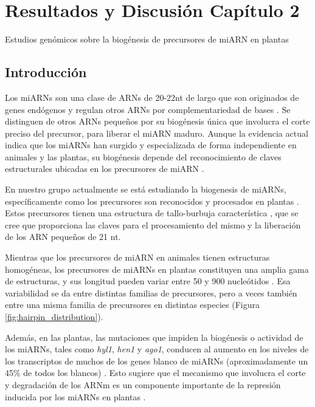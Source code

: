 \graphicspath{{Chapter2/Figs/}}

\setcounter{chapter}{5}
\chapter*{Resultados y Discusión Capítulo 2} 

{\LARGE Estudios genómicos sobre la biogénesis de precursores de miARN en plantas}


\section{Introducción}
Los miARNs son una clase de ARNs de 20-22nt de largo que son originados de genes endógenos y regulan otros ARNs por complementariedad de bases \citep{Voinnet2009669}.
Se distinguen de otros ARNs pequeños por su biogénesis única que involucra el corte preciso del precursor, para liberar el miARN maduro.
Aunque la evidencia actual indica que los miARNs han surgido y especializada de forma independiente en animales y las plantas, su biogénesis depende del reconocimiento de claves estructurales ubicadas en los precursores de miARN \citep{pmid21554756,citeulike:8816489,Bologna11112012}.

En nuestro grupo actualmente se está estudiando la biogenesis de miARNs, específicamente como los precursores son reconocidos y procesados en plantas \citep{Bologna2013}.
Estos precursores tienen una estructura de tallo-burbuja característica \citep{Jones-Rhoades2006}, que se cree que proporciona las claves para el procesamiento del mismo y la liberación de los ARN pequeños de 21 nt.

Mientras que los precursores de miARN en animales tienen estructuras homogéneas, los precursores de miARNs en plantas constituyen una amplia gama de estructuras, y sus longitud pueden variar entre 50 y 900 nucleótidos \citep{Bologna2013,citeulike:8816489}.
Esa variabilidad se da entre distintas familias de precursores, pero a veces también entre una misma familia de precursores en distintas especies (Figura \ref{fig:hairpin_distribution}).

Además, en las plantas, las mutaciones que impiden la biogénesis o actividad de los miARNs, tales como \textit{hyl1}, \textit{hen1} y \textit{ago1}, conducen al aumento en los niveles de los transcriptos de muchos de los genes blanco de miARNs (aproximadamente un 45\% de todos los blancos) \citep{Han2004,pmid12747833,pmid16889646,Allen2005207}.
Esto sugiere que el mecanismo que involucra el corte y degradación de los ARNm es un componente importante de la represión inducida por los miARNs en plantas \citep{Jones-Rhoades2006, Voinnet2009669}.

